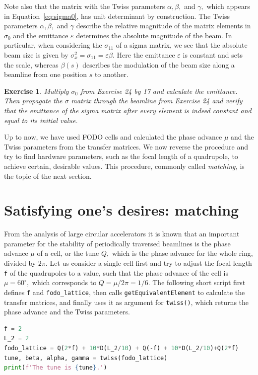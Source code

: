 \documentclass{article}
\newtheorem{exercise}{Exercise}
\newcommand\eps{\varepsilon}
\begin{document}
Note also that the matrix with the Twiss parameters $\alpha,\beta,$ and $\gamma,$ which
appears in Equation~\ref{eq:sigma0}, has
unit determinant by construction. The Twiss parameters $\alpha, \beta,$ and $\gamma$ 
describe the relative magnitude of the matrix elements in $\sigma_0$ and the
emittance $\eps$ determines the absolute magnitude of the beam. In particular, when
considering the $\sigma_{11}$ of a sigma matrix, we see that the absolute beam size is
given by $\sigma_x^2=\sigma_{11}=\eps\beta.$ Here the emittance $\eps$ is constant 
and sets the scale, whereas $\beta(s)$ describes the modulation of the beam size
along a beamline from one position $s$ to another.

\begin{exercise}
Multiply $\sigma_0$ from Exercise 24 by 17 and calculate the emittance. Then propagate the $\sigma$ matrix through the beamline from Exercise 24 and verify that the emittance of the sigma matrix after every element is indeed constant and equal to its initial value.
\end{exercise}

Up to now, we have used FODO cells and calculated the phase advance $\mu$ and the 
Twiss parameters from the transfer matrices. We now reverse the procedure and try
to find hardware parameters, such as the focal length of a quadrupole, to achieve
certain, desirable values. This procedure, commonly called {\em matching,} is the
topic of the next section.
%
\section{Satisfying one's desires: matching}
%
From the analysis of large circular accelerators it is known that an important parameter 
for the stability of periodically traversed beamlines is the phase advance $\mu$ of
a cell, or the tune $Q,$ which is the phase advance for the whole ring, 
divided by $2\pi.$ Let us consider a single cell first and try to adjust the
focal length {\tt f} of the quadrupoles to a value, such that the phase advance of
the cell is $\mu=60^\circ,$ which corresponds to $Q=\mu/2\pi=1/6.$ The following
short script first defines {\tt f} and {\tt fodo\_lattice}, then calls {\tt getEquivalentElement} to
calculate the transfer matrices, and finally uses it
as argument for {\tt twiss()}, which returns the phase advance and the Twiss 
parameters. 

\begin{lstlisting}[language=Python]
f = 2
L_2 = 2
fodo_lattice = Q(2*f) + 10*D(L_2/10) + Q(-f) + 10*D(L_2/10)+Q(2*f)
tune, beta, alpha, gamma = twiss(fodo_lattice)
print(f'The tune is {tune}.')
\end{lstlisting}
\end{document}
